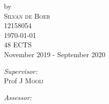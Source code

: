 \begin{titlepage}
    
    
    by\\[0.2cm]
    
    \textsc{\Large Silvan de Boer}\\[0.2cm] %
    
    12158054\\[1cm]
    
    
    
    
    
    
    
    
    
    
    {\Large \today}\\[1cm] %
    
    
    
    48 ECTS\\ %
    
    November 2019 - September 2020\\[1cm]%
    
    
    
    
    
    
    
    \begin{minipage}[t]{0.4\textwidth}

    \begin{flushleft} \large
    
    \emph{Supervisor:} \\
    
    Prof J \textsc{Mooij} %
    
    \end{flushleft}
    
    \end{minipage}%
    \begin{minipage}[t]{0.4\textwidth}
    
    \begin{flushright} \large
    
    \emph{Assessor:} \\
    

\end{flushright}
\end{minipage}
\end{titlepage}
